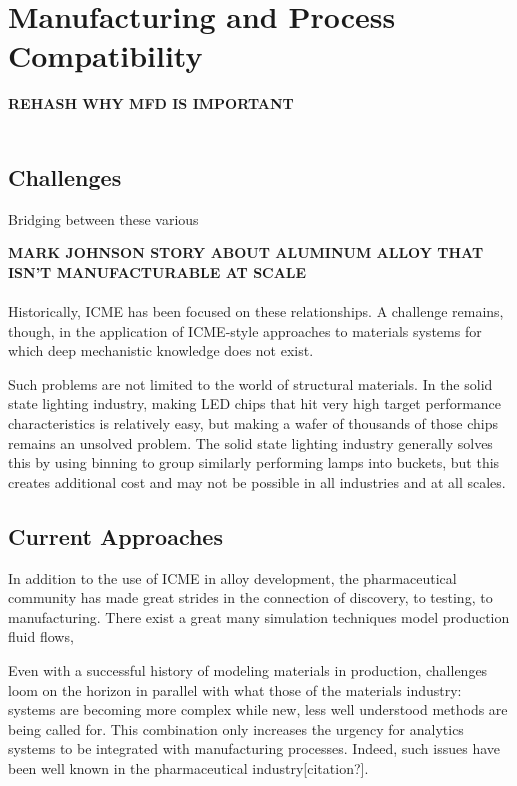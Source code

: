 

\section{Manufacturing and Process Compatibility}

\textbf{REHASH WHY MFD IS IMPORTANT}\\
\\

\subsection{Challenges}
Bridging between these various 

\textbf{MARK JOHNSON STORY ABOUT ALUMINUM ALLOY THAT ISN'T MANUFACTURABLE AT SCALE}\\
\\
Historically, ICME has been focused on these relationships. A challenge remains, though, in the application of ICME-style approaches to materials systems for which deep mechanistic knowledge does not exist. 

Such problems are not limited to the world of structural materials. In the solid state lighting industry, making LED chips that hit very high target performance characteristics is relatively easy, but making a wafer of thousands of those chips remains an unsolved problem. The solid state lighting industry generally solves this by using binning to group similarly performing lamps into buckets, but this creates additional cost and may not be possible in all industries and at all scales. 

\subsection{Current Approaches}
In addition to the use of ICME in alloy development, the pharmaceutical community has made great strides in the connection of discovery, to testing, to manufacturing. There exist a great many simulation techniques model production fluid flows,

Even with a successful history of modeling materials in production, challenges loom on the horizon in parallel with what those of the materials industry: systems are becoming more complex while new, less well understood methods are being called for. This combination only increases the urgency for analytics systems to be integrated with manufacturing processes.\cite{JPS:JPS24594} Indeed, such issues have been well known in the pharmaceutical industry[citation?].


